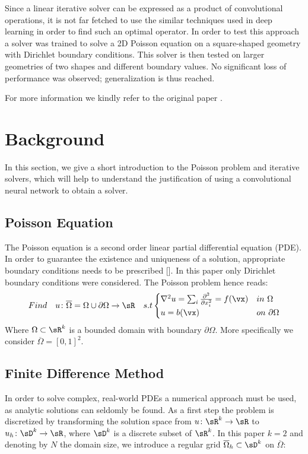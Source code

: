 \documentclass{article} %
\begin{document}
Since a linear iterative solver can be expressed as a product of convolutional operations, it is not far fetched to use the similar techniques used in deep learning in order to find such an optimal operator.
In order to test this approach a solver was trained to solve a 2D Poisson equation on a square-shaped geometry with Dirichlet boundary conditions. This solver is then tested on larger geometries of two shapes and different boundary values. No significant loss of performance was observed; generalization is thus reached.

For more information we kindly refer to the original paper \cite{original_paper}.

\section{Background}

In this section, we give a short introduction to the Poisson problem and iterative solvers, which will help to understand the justification of using a convolutional neural network to obtain a solver.

\subsection{Poisson Equation}

The Poisson equation is a second order linear partial differential equation (PDE). In order to guarantee the existence and uniqueness of a solution, appropriate boundary conditions needs to be prescribed [\cite{elliptic}]. In this paper only Dirichlet boundary conditions were considered.
The Poisson problem hence reads:
\begin{equation}
Find \quad u \colon \overline{\Omega}=\Omega\cup\partial\Omega \to \sR \quad s.t
\begin{cases}
\nabla^2 u = \sum_{i}\frac{\partial^2}{\partial x_i^2} = f(\vx) & in \ \Omega\\
u = b(\vx) & on \ \partial \Omega\\
\end{cases}
\label{poisson_def}
\end{equation}
Where $\Omega \subset \sR^k$ is a bounded domain with boundary $\partial\Omega$. More specifically we consider $\overline{\Omega} = [0,1]^2$.

\subsection{Finite Difference Method}
In order to solve complex, real-world PDEs a numerical approach must be used, as analytic solutions can seldomly be found. As a first step the problem is discretized by transforming the solution space from $u\colon\sR^k \to \sR$ to $u_h\colon\sD^k \to \sR$, where $\sD^k$ is a discrete subset of $\sR^k$. In this paper $k = 2$ and denoting by $N$ the domain size, we introduce a regular grid $\overline{\Omega}_h \subset \sD^k$ on  $\overline{\Omega}$: 
\end{document}

